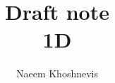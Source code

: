 \documentclass[12pt,letterpaper]{article}
\begin{document}
\title{\textbf{Draft note}\\{\small \textbf{1D}}}
\author{Naeem Khoshnevis}
\date{}
\maketitle

\newpage




\end{document}
